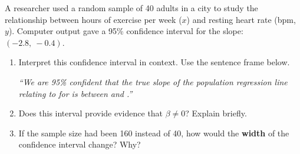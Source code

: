 \documentclass[10pt]{article}
\begin{document}
\namedateperiod

\vspace{0.15in}

A researcher used a random sample of 40 adults in a city to study the relationship between
hours of exercise per week ($x$) and resting heart rate (bpm, $y$).
Computer output gave a 95\% confidence interval for the slope: $(-2.8,\ -0.4)$.

\begin{enumerate}

  \item Interpret this confidence interval in context. Use the sentence frame below.

        \textit{``We are 95\% confident that the true slope of the population regression line
        relating \blank{4cm} to \blank{4cm} for \blank{4cm} is between \blank{2cm} and
        \blank{2cm} \blank{3cm}.''}

        \vspace{0.1in}

  \item Does this interval provide evidence that $\beta \ne 0$? Explain briefly.


  \item If the sample size had been 160 instead of 40, how would the \textbf{width} of the
        confidence interval change? Why?


\end{enumerate}
\end{document}
